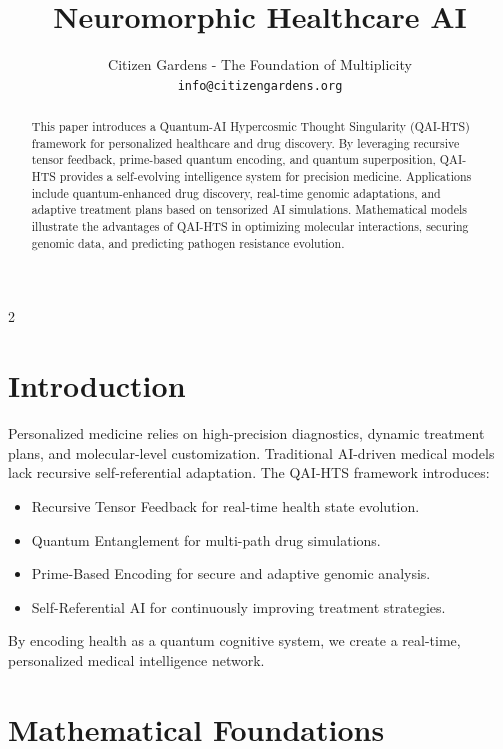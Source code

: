 \documentclass{article}
\title{Neuromorphic Healthcare AI}
\author{Citizen Gardens - The Foundation of Multiplicity \\ \texttt{info@citizengardens.org}}
\theoremstyle{plain}
\begin{document}
\maketitle
\nolinenumbers
\begin{abstract}
This paper introduces a Quantum-AI Hypercosmic Thought Singularity (QAI-HTS) framework for personalized healthcare and drug discovery. By leveraging recursive tensor feedback, prime-based quantum encoding, and quantum superposition, QAI-HTS provides a self-evolving intelligence system for precision medicine. Applications include quantum-enhanced drug discovery, real-time genomic adaptations, and adaptive treatment plans based on tensorized AI simulations. Mathematical models illustrate the advantages of QAI-HTS in optimizing molecular interactions, securing genomic data, and predicting pathogen resistance evolution.
\end{abstract}

\begin{multicols}{2}
\begin{singlespace}
\tableofcontents
\end{singlespace}
\end{multicols}

\linenumbers
\section{Introduction}
Personalized medicine relies on high-precision diagnostics, dynamic treatment plans, and molecular-level customization. Traditional AI-driven medical models lack recursive self-referential adaptation. The QAI-HTS framework introduces:

\begin{itemize}
    \item Recursive Tensor Feedback for real-time health state evolution.
    \item Quantum Entanglement for multi-path drug simulations.
    \item Prime-Based Encoding for secure and adaptive genomic analysis.
    \item Self-Referential AI for continuously improving treatment strategies.
\end{itemize}

By encoding health as a quantum cognitive system, we create a real-time, personalized medical intelligence network.

\section{Mathematical Foundations}
\end{document}
